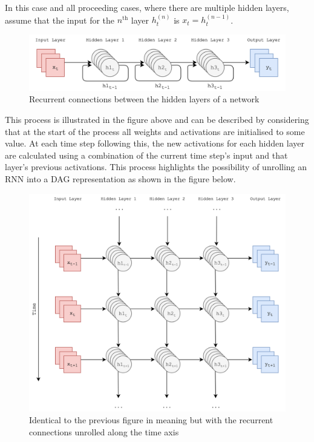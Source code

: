 \documentclass[12pt,]{article}
\begin{document}
In this case and all proceeding cases, where there are multiple hidden
layers, assume that the input for the \(n^{\text{th}}\) layer
\(h^{(n)}_t\) is \(x_t = h^{(n-1)}_t\).

\begin{figure}
\centering
\includegraphics{Images/rnn.png}
\caption{Recurrent connections between the hidden layers of a network}
\end{figure}

This process is illustrated in the figure above and can be described by
considering that at the start of the process all weights and activations
are initialised to some value. At each time step following this, the new
activations for each hidden layer are calculated using a combination of
the current time step's input and that layer's previous activations.
This process highlights the possibility of unrolling an RNN into a DAG
representation as shown in the figure below.

\begin{figure}
\centering
\includegraphics{Images/unrolledrnn.png}
\caption{Identical to the previous figure in meaning but with the
recurrent connections unrolled along the time axis}
\end{figure}
\end{document}
